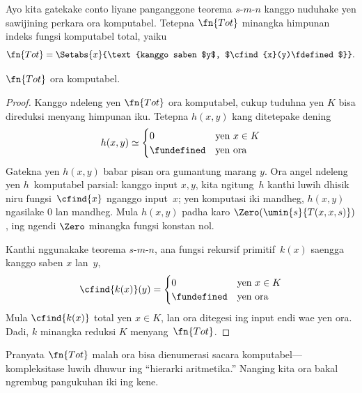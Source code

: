 \documentclass[../../../include/open-logic-section]{subfiles}
\begin{document}

Ayo kita gatekake conto liyane panganggone teorema $s$-$m$-$n$
kanggo nuduhake yen sawijining perkara ora komputabel. Tetepna
$\fn{Tot}$ minangka himpunan indeks fungsi komputabel total, yaiku
\[
\fn{Tot} = \Setabs{x}{\text{kanggo saben $y$, $\cfind{x}(y)\fdefined$}}.
\]

\begin{prop}
$\fn{Tot}$ ora komputabel.
\end{prop}

\begin{proof}
Kanggo ndeleng yen $\fn{Tot}$ ora komputabel, cukup tuduhna yen $K$
bisa direduksi menyang himpunan iku. Tetepna $h(x,y)$ kang ditetepake dening
\[
h(x,y) \simeq
\begin{cases}
0 & \text{yen $x \in K$} \\
\fundefined & \text{yen ora}
\end{cases}
\]
Gatekna yen $h(x,y)$ babar pisan ora gumantung marang $y$.
Ora angel ndeleng yen $h$~komputabel parsial: kanggo
input $x, y$, kita ngitung~$h$ kanthi luwih dhisik
niru fungsi~$\cfind{x}$ nganggo input~$x$; yen komputasi
iki mandheg, $h(x,y)$ ngasilake $0$ lan mandheg. Mula
$h(x,y)$ padha karo $\Zero(\umin{s}{T(x,x,s)})$, ing ngendi
$\Zero$ minangka fungsi konstan nol.

Kanthi nggunakake teorema $s$-$m$-$n$, ana fungsi
rekursif primitif~$k(x)$ saengga kanggo saben $x$ lan~$y$,
\[
\cfind{k(x)}(y) =
\begin{cases}
0 & \text{yen $x \in K$} \\
\fundefined & \text{yen ora}
\end{cases}
\]
Mula $\cfind{k(x)}$ total yen $x \in K$, lan ora
ditegesi ing input endi wae yen ora. Dadi,
$k$ minangka reduksi $K$ menyang~$\fn{Tot}$.
\end{proof}

\begin{digress}
Pranyata $\fn{Tot}$ malah ora bisa dienumerasi sacara
komputabel---kompleksitase luwih dhuwur ing
``hierarki aritmetika.'' Nanging kita ora bakal
ngrembug pangukuhan iki ing kene.
\end{digress}
\end{document}
